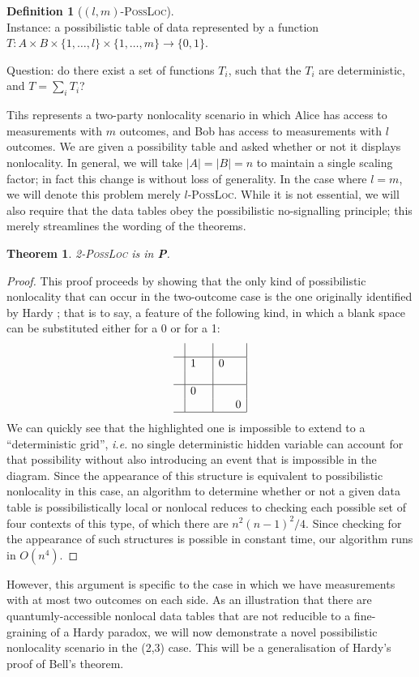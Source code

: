 \documentclass[reprint]{revtex4-1}
\newtheorem{thm}{Theorem}
\theoremstyle{definition}
\newtheorem{defn}{Definition}
\begin{document}
\begin{defn}[$(l,m)$-\textsc{PossLoc}]
\quad\\
Instance: a possibilistic table of data represented by a  function $T:A\times B \times \{1,\dots, l\}\times \{1,\dots, m\}\rightarrow\{0,1\}$.

Question: do there exist a set of functions $T_i$, such that the $T_i$ are deterministic, and $T=\sum_i T_i$?
\end{defn}
Tihs represents a two-party nonlocality scenario in which Alice has access to measurements with $m$ outcomes, and Bob has access to measurements with $l$ outcomes. We are given a possibility table and asked whether or not it displays nonlocality. In general, we will take $|A|=|B|=n$ to maintain a single scaling factor; in fact this change is without loss of generality. In the case where $l=m$, we will denote this problem merely $l$-\textsc{PossLoc}. While it is not essential, we will also require that the data tables obey the possibilistic no-signalling principle; this merely streamlines the wording of the theorems. 
\begin{thm} \cite{Mans2017}
2-\textsc{PossLoc} is in \textbf{P}.
\end{thm}
\begin{proof}
This proof proceeds by showing that the only kind of possibilistic nonlocality that can occur in the two-outcome case is the one originally identified by Hardy \cite{Hard1993}; that is to say, a feature of the following kind, in which a blank space can be substituted either for a 0 or for a 1:
\begin{equation*}
\begin{array}{c| c c | c c |}
&&&&\\ \hline
&1 & & 0 & \\
&& & & \\ \hline
&0& & &  \\
&& & & 0 \\ \hline
\end{array}
\end{equation*}
We can quickly see that the highlighted one is impossible to extend to a ``deterministic grid'', \emph{i.e.} no single deterministic hidden variable can account for that possibility without also introducing an event that is impossible in the diagram. Since the appearance of this structure is equivalent to possibilistic nonlocality in this case, an algorithm to determine whether or not a given data table is possibilistically local or nonlocal reduces to checking each possible set of four contexts of this type, of which there are $n^2(n-1)^2/4$. Since checking for the appearance of such structures is possible in constant time, our algorithm runs in $O(n^4)$.
\end{proof}
However, this argument is specific to the case in which we have measurements with at most two outcomes on each side. As an illustration that there are quantumly-accessible nonlocal data tables that are not reducible to a fine-graining of a Hardy paradox, we will now demonstrate a novel possibilistic nonlocality scenario in the (2,3) case. This will be a generalisation of Hardy's proof of Bell's theorem.
\end{document}

